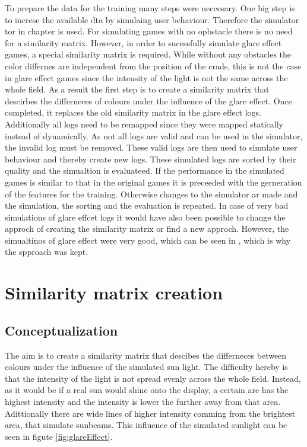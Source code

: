 To prepare the data for the training many steps were neccesary. One big step is to increse the available dta by simulaing user behaviour. Therefore the simulator	tor in chapter  is used. For simulating games with no opbstacle there is no need for a similarity matrix. However, in order to sucessfully simulate glare effect games, a special similarity matrix is required. While without any obstacles the color differnes are independent from the position of the crads, this is not the case in glare effect games since the intensity of the light is not the same across the whole field. As a result the first step is to create a similarity matrix that descirbes the differneces of colours under the influence of the glare effect. Once completed, it replaces the old similarity matrix in the glare effect logs. Additionally all logs need to be remapped since they were mapped statically instead of dynamically. As not all logs are valid and can be used in the simulator, the invalid log must be removed. These valid logs are then used to simulate user behaviour and thereby create new logs. These simulated logs are sorted by their quality and the simualtion is evaluateed. If the performance in the simulated games is similar to that in the original games it is preceeded with the gerneration of the features for the training. Otherwise changes to the simulator ar made and the simulation, the sorting and the evaluation is repeated. In case of very bad simulations of glare effcet logs it would have also been possible to change the approch of creating the similarity matrix or find a new approch. However, the simualtinos of glare effect were very good, which can be seen in , which is why the spproach was kept.

\section{Similarity matrix creation}

\subsection{Conceptualization}
The aim is to create a similarity matrix that descibes the differneces between colours under the influence of the simulated sun light. The difficulty hereby is that the intensity of the light is not spread evenly across the whole field. Instead, as it would be if a real sun would shine onto the display, a certain are has the highest intensity and the intensity is lower the further away from that area. Adittionally there are wide lines of higher intensity comming from the brightest area, that simulate sunbeams. This influence of the simulated sunlight can be seen in figute \ref{fig:glareEffect}. 

